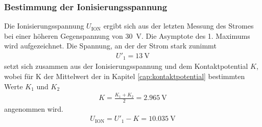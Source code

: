 \subsubsection{Bestimmung der Ionisierungsspannung}\label{sec:auswertung4}
Die Ionisierungsspannung $U_\text{ION}$ ergibt sich aus der letzten Messung des Stromes bei einer höheren Gegenspannung von \SI{30}{\volt}.  Die Asymptote des 1. Maximums wird aufgezeichnet. Die Spannung, an der der Strom stark zunimmt
\begin{align}
	U'_1 = \SI{13}{\volt}
\end{align}
 setzt sich zusammen aus der Ionisierungsspannung und dem Kontaktpotential $K$, wobei für K der Mittelwert der in Kapitel \ref{cap:kontaktpotential} bestimmten Werte $K_1$ und $K_2$
 \begin{align}
 K = \frac{K_1+K_2}{2} = \SI{2.965}{\volt}
 \end{align}
 angenommen wird. 
\begin{align}
	U_\text{ION} = U'_1 - K = \SI{10.035}{\volt}
\end{align}



